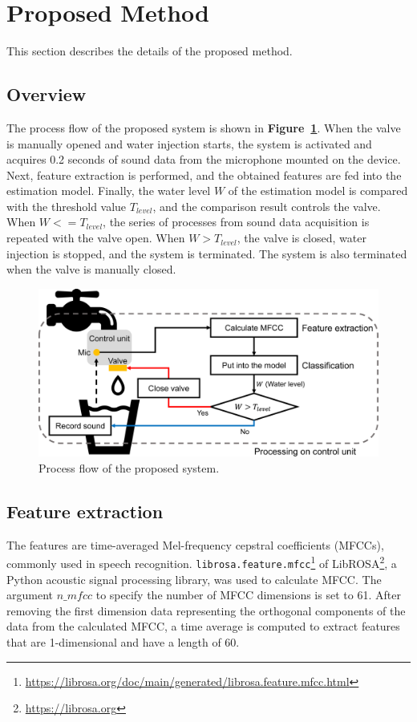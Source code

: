 \documentclass[sigconf,authordraft]{acmart}
\newcommand\figref[1]{\textbf{Figure~\ref{fig:#1}}}
\begin{document}
\section{Proposed Method}
\label{sec:method}
This section describes the details of the proposed method.

\subsection{Overview}
The process flow of the proposed system is shown in \figref{method}. When the valve is manually opened and water injection starts, the system is activated and acquires 0.2 seconds of sound data from the microphone mounted on the device. Next, feature extraction is performed, and the obtained features are fed into the estimation model. Finally, the water level $W$ of the estimation model is compared with the threshold value $T_{level}$, and the comparison result controls the valve. When $W<=T_{level}$, the series of processes from sound data acquisition is repeated with the valve open. When $W>T_{level}$, the valve is closed, water injection is stopped, and the system is terminated. The system is also terminated when the valve is manually closed.

\begin{figure}[!t]
  \centering
  \includegraphics[width=0.8\linewidth]{figures/method.eps}
  \caption{Process flow of the proposed system.}
  \label{fig:method}
\end{figure}


\subsection{Feature extraction}
The features are time-averaged Mel-frequency cepstral coefficients (MFCCs), commonly used in speech recognition. \texttt{librosa.feature.mfcc}\footnote{\url{https://librosa.org/doc/main/generated/librosa.feature.mfcc.html}} of LibROSA\footnote{\url{https://librosa.org}}, a Python acoustic signal processing library, was used to calculate MFCC. The argument $n\_mfcc$ to specify the number of MFCC dimensions is set to 61. After removing the first dimension data representing the orthogonal components of the data from the calculated MFCC, a time average is computed to extract features that are 1-dimensional and have a length of 60.
\end{document}
